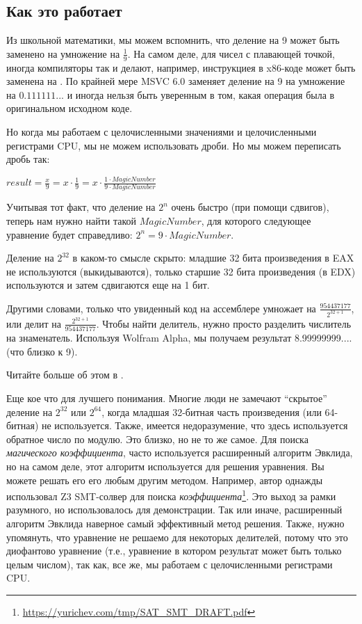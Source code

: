 ﻿\subsection{Как это работает}

Из школьной математики, мы можем вспомнить, что деление на 9 может быть заменено на умножение на $\frac{1}{9}$.
На самом деле, для чисел с плавающей точкой, иногда компиляторы так и делают,
например, инструкциея  в x86-коде может быть заменена на .
По крайней мере MSVC 6.0 заменяет деление на 9 на умножение на $0.111111...$ и иногда нельзя быть уверенным в том,
какая операция была в оригинальном исходном коде.

Но когда мы работаем с целочисленными значениями и целочисленными регистрами CPU, мы не можем использовать дроби.
Но мы можем переписать дробь так:

\begin{center}
$result = \frac{x}{9} = x \cdot \frac{1}{9} = x \cdot \frac{1 \cdot MagicNumber}{9 \cdot MagicNumber}$
\end{center}

Учитывая тот факт, что деление на $2^n$ очень быстро (при помощи сдвигов), теперь нам нужно найти такой $MagicNumber$,
для которого следующее уравнение будет справедливо: $2^n = 9 \cdot MagicNumber$.

Деление на $2^{32}$ в каком-то смысле скрыто: младшие 32 бита произведения в EAX не используются (выкидываются),
только старшие 32 бита произведения (в EDX) используются и затем сдвигаются еще на 1 бит.

Другими словами, только что увиденный код на ассемблере умножает на {\Large $\frac{954437177}{2^{32+1}}$},
или делит на {\Large $\frac{2^{32+1}}{954437177}$}.
Чтобы найти делитель, нужно просто разделить числитель на знаменатель.
Используя Wolfram Alpha, мы получаем результат 8.99999999.... (что близко к 9).


Читайте больше об этом в .

Еще кое что для лучшего понимания.
Многие люди не замечают ``скрытое'' деление на $2^{32}$ или $2^{64}$,
когда младшая 32-битная часть произведения (или 64-битная) не используется.
Также, имеется недоразумение, что здесь используется обратное число по модулю.
Это близко, но не то же самое.
Для поиска \textit{магического коэффициента}, часто используется расширенный алгоритм Эвклида, но на самом деле,
этот алгоритм используется для решения уравнения.
Вы можете решать его его любым другим методом.
Например, автор однажды использовал Z3 SMT-солвер для поиска \textit{коэффициента}\footnote{\url{https://yurichev.com/tmp/SAT_SMT_DRAFT.pdf}}.
Это выход за рамки разумного, но использовалось для демонстрации.
Так или иначе, расширенный алгоритм Эвклида наверное самый эффективный метод решения.
Также, нужно упомянуть, что уравнение не решаемо для некоторых делителей, потому что это диофантово уравнение
(т.е., уравнение в котором результат может быть только целым числом), так как, все же, мы работаем с целочисленными
регистрами CPU.


